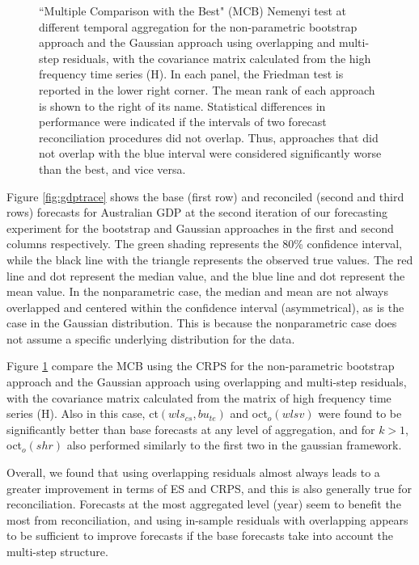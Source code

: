 \documentclass[a4paper,11pt]{article}
\theoremstyle{definition}
\begin{document}
\begin{figure}[p]
\caption{“Multiple Comparison with the Best" (MCB) Nemenyi test at different temporal aggregation for the non-parametric bootstrap approach and the Gaussian approach using overlapping and multi-step residuals, with the covariance matrix calculated from the high frequency time series (H). In each panel, the Friedman test is reported in the lower right corner. The mean rank of each approach is shown to the right of its name. Statistical differences in performance were indicated if the intervals of two forecast reconciliation procedures did not overlap. Thus, approaches that did not overlap with the blue interval were considered significantly worse than the best, and vice versa.}
\label{fig:mcb}
\end{figure}

Figure \ref{fig:gdptrace} shows the base (first row) and reconciled (second and third rows) forecasts for Australian GDP at the second iteration of our forecasting experiment for the bootstrap and Gaussian approaches in the first and second columns respectively. The green shading represents the 80\% confidence interval, while the black line with the triangle represents the observed true values. The red line and dot represent the median value, and the blue line and dot represent the mean value. In the nonparametric case, the median and mean are not always overlapped and centered within the confidence interval (asymmetrical), as is the case in the Gaussian distribution. This is because the nonparametric case does not assume a specific underlying distribution for the data.

Figure \ref{fig:mcb} compare the MCB using the CRPS for the non-parametric bootstrap approach and the Gaussian approach using overlapping and multi-step residuals, with the covariance matrix calculated from the matrix of high frequency time series (H). Also in this case, ct$(wls_{cs},bu_{te})$ and oct$_o(wlsv)$ were found to be significantly better than base forecasts at any level of aggregation, and for $k>1$, oct$_{o}(shr)$ also performed similarly to the first two in the gaussian framework.

Overall, we found that using overlapping residuals almost always leads to a greater improvement in terms of ES and CRPS, and this is also generally true for reconciliation. Forecasts at the most aggregated level (year) seem to benefit the most from reconciliation, and using in-sample residuals with overlapping appears to be sufficient to improve forecasts if the base forecasts take into account the multi-step structure.
\end{document}
